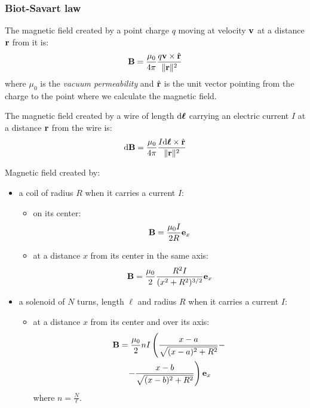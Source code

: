 \documentclass[../../../main.tex]{subfiles}
\begin{document}
\begin{multicols}{2}
  \subsubsection{Biot-Savart law}
  \begin{prop}
    The magnetic field created by a point charge $q$ moving at velocity $\boldsymbol{\mathrm{v}}$ at a distance $\boldsymbol{\mathrm{r}}$ from it is:
    $$\boldsymbol{\mathrm{B}}=\frac{\mu_0}{4\pi}\frac{q\boldsymbol{\mathrm{v}}\times\Hat{\boldsymbol{\mathrm{r}}}}{\|\boldsymbol{\mathrm{r}}\|^2}$$ where $\mu_0$ is the \textit{vacuum permeability} and $\Hat{\boldsymbol{\mathrm{r}}}$ is the unit vector pointing from the charge to the point where we calculate the magnetic field.
  \end{prop}
  \begin{law}
    The magnetic field created by a wire of length $\dd\vb*{\ell}$ carrying an electric current $I$ at a distance $\boldsymbol{\mathrm{r}}$ from the wire is: $$\dd\boldsymbol{\mathrm{B}}=\frac{\mu_0}{4\pi}\frac{I\dd\vb*{\ell}\times\hat{\boldsymbol{\mathrm{r}}}}{\|\boldsymbol{\mathrm{r}}\|^2}$$
  \end{law}
  \begin{prop}
    Magnetic field created by:
    \begin{itemize}
      \item a coil of radius $R$ when it carries a current $I$:
            \begin{itemize}
              \item on its center: $$\boldsymbol{\mathrm{B}}=\frac{\mu_0I}{2R}\boldsymbol{\mathrm{e}}_x$$
              \item at a distance $x$ from its center in the same axis: $$\boldsymbol{\mathrm{B}}=\frac{\mu_0}{2}\frac{R^2I}{(x^2+R^2)^{3/2}}\boldsymbol{\mathrm{e}}_x$$
            \end{itemize}
      \item a solenoid of $N$ turns, length $\ell$ and radius $R$ when it carries a current $I$:
            \begin{itemize}
              \item at a distance $x$ from its center and over its axis:
                    \begin{multline*} \boldsymbol{\mathrm{B}}=\frac{\mu_0}{2}nI\left(\frac{x-a}{\sqrt{(x-a)^2+R^2}}-\right.\\\left.-\frac{x-b}{\sqrt{(x-b)^2+R^2}}\right)\boldsymbol{\mathrm{e}}_x
                    \end{multline*} where $n=\frac{N}{\ell}$.
                    \begin{center}

\end{center}
\end{itemize}
\end{itemize}
\end{prop}
\end{multicols}
\end{document}
